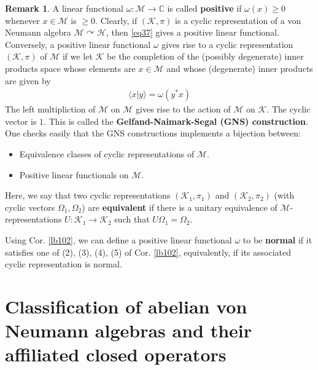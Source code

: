 \documentclass[12pt,b5paper,notitlepage]{article}
\theoremstyle{definition}
\newtheorem{rem}[df]{Remark}
\theoremstyle{plain}
\newcommand{\mc}{\mathcal}
\newcommand{\bk}[1]{\langle {#1}\rangle}
\newcommand{\Cbb}{\mathbb C}
\numberwithin{equation}{section}
\begin{document}
\begin{rem}
A linear functional $\omega:\mc M\rightarrow\Cbb$ is called \textbf{positive} if $\omega(x)\geq0$ whenever $x\in\mc M$ is $\geq0$. Clearly, if $(\mc K,\pi)$ is a cyclic representation of a von Neumann algebra $\mc M\curvearrowright\mc H$, then \eqref{eq37} gives a positive linear functional. Conversely, a positive linear functional $\omega$ gives rise to a cyclic representation $(\mc K,\pi)$ of $\mc M$ if we let $\mc K$ be the completion of the (possibly degenerate) inner products space whose elements are $x\in\mc M$ and whose (degenerate) inner products are given by
\begin{align*}
\bk{x|y}=\omega(y^*x)
\end{align*}
The left multipliction of $\mc M$ on $\mc M$ gives rise to the action of $\mc M$ on $\mc K$. The cyclic vector is $1$. This is called the \textbf{Gelfand-Naimark-Segal (GNS) construction}. One checks easily that the GNS constructions implements a bijection between:
\begin{itemize}
\item Equivalence classes of cyclic representations of $\mc M$.
\item Positive linear functionals on $\mc M$.
\end{itemize}
Here, we say that two cyclic representations $(\mc K_1,\pi_1)$ and $(\mc K_2,\pi_2)$ (with cyclic vectors $\Omega_1,\Omega_2$) are \textbf{equivalent} if there is a unitary equivalence of $\mc M$-representations $U:\mc K_1\rightarrow\mc K_2$ such that $U\Omega_1=\Omega_2$.

Using Cor. \ref{lb102}, we can define a positive linear functional $\omega$ to be \textbf{normal} if it satisfies one of (2), (3), (4), (5) of Cor. \ref{lb102}, equivalently, if its associated cyclic representation is normal.  \hfill\qedsymbol
\end{rem}




























\section{Classification of abelian von Neumann algebras and their affiliated closed operators}
\end{document}
